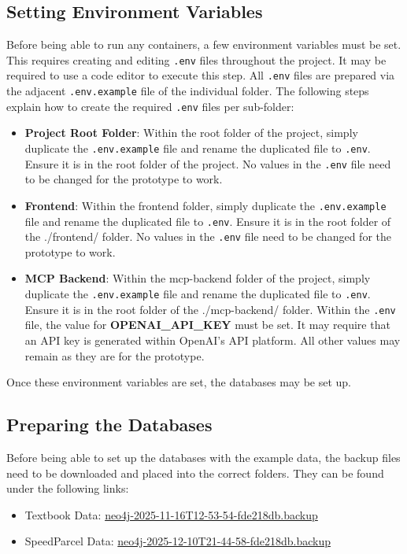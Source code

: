 \subsection{Setting Environment Variables}
\label{appendix:env_vars}
Before being able to run any containers, a few environment variables must be set. This requires creating and editing \texttt{.env} files throughout the project. It may be required to use a code editor to execute this step. All \texttt{.env} files are prepared via the adjacent \texttt{.env.example} file of the individual folder. The following steps explain how to create the required \texttt{.env} files per sub-folder:
\begin{itemize}
	\item \textbf{Project Root Folder}: Within the root folder of the project, simply duplicate the \texttt{.env.example} file and rename the duplicated file to \texttt{.env}. Ensure it is in the root folder of the project. No values in the \texttt{.env} file need to be changed for the prototype to work.
	\item \textbf{Frontend}: Within the frontend folder, simply duplicate the \texttt{.env.example} file and rename the duplicated file to \texttt{.env}. Ensure it is in the root folder of the ./frontend/ folder. No values in the \texttt{.env} file need to be changed for the prototype to work.
	\item \textbf{MCP Backend}: Within the mcp-backend folder of the project, simply duplicate the \texttt{.env.example} file and rename the duplicated file to \texttt{.env}. Ensure it is in the root folder of the ./mcp-backend/ folder. Within the \texttt{.env} file, the value  for \textbf{OPENAI\_API\_KEY} must be set. It may require that an API key is generated within OpenAI's API platform. All other values may remain as they are for the prototype.
\end{itemize}

Once these environment variables are set, the databases may be set up.

\subsection{Preparing the Databases}
\label{appendix:db_backups}
Before being able to set up the databases with the example data, the backup files need to be downloaded and placed into the correct folders. They can be found under the following links:

\begin{itemize}
  \item Textbook Data: \href{https://bscw.frankfurt-university.de/EduRes/bscw/bscw.cgi/d21657796/neo4j-2025-11-16T12-53-54-fde218db.backup}{neo4j-2025-11-16T12-53-54-fde218db.backup}
  \item SpeedParcel Data: \href{https://bscw.frankfurt-university.de/EduRes/bscw/bscw.cgi/d21814333/neo4j-2025-12-10T21-44-58-fde218db.backup}{neo4j-2025-12-10T21-44-58-fde218db.backup}
\end{itemize}

